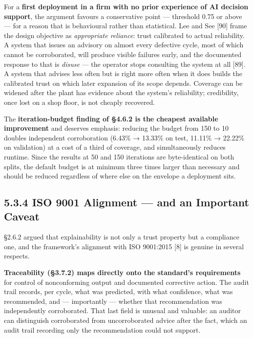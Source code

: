 For a \textbf{first deployment in a firm with no prior experience of AI decision support}, the argument favours a conservative point --- threshold 0.75 or above --- for a reason that is behavioural rather than statistical. Lee and See {[}90{]} frame the design objective as \emph{appropriate reliance}: trust calibrated to actual reliability. A system that issues an advisory on almost every defective cycle, most of which cannot be corroborated, will produce visible failures early, and the documented response to that is \emph{disuse} --- the operator stops consulting the system at all {[}89{]}. A system that advises less often but is right more often when it does builds the calibrated trust on which later expansion of its scope depends. Coverage can be widened after the plant has evidence about the system's reliability; credibility, once lost on a shop floor, is not cheaply recovered.

The \textbf{iteration-budget finding of §4.6.2 is the cheapest available improvement} and deserves emphasis: reducing the budget from 150 to 10 doubles independent corroboration (6.43\% → 13.33\% on test, 11.11\% → 22.22\% on validation) at a cost of a third of coverage, and simultaneously reduces runtime. Since the results at 50 and 150 iterations are byte-identical on both splits, the default budget is at minimum three times larger than necessary and should be reduced regardless of where else on the envelope a deployment sits.

\hypertarget{iso-9001-alignment-and-an-important-caveat}{%
\subsection{5.3.4 ISO 9001 Alignment --- and an Important Caveat}\label{iso-9001-alignment-and-an-important-caveat}}

§2.6.2 argued that explainability is not only a trust property but a compliance one, and the framework's alignment with ISO 9001:2015 {[}8{]} is genuine in several respects.

\textbf{Traceability (§3.7.2) maps directly onto the standard's requirements} for control of nonconforming output and documented corrective action. The audit trail records, per cycle, what was predicted, with what confidence, what was recommended, and --- importantly --- whether that recommendation was independently corroborated. That last field is unusual and valuable: an auditor can distinguish corroborated from uncorroborated advice after the fact, which an audit trail recording only the recommendation could not support.

